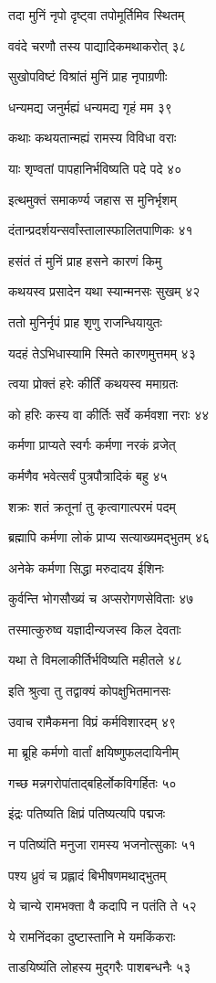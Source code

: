 तदा मुनिं नृपो दृष्ट्वा तपोमूर्तिमिव स्थितम्

ववंदे चरणौ तस्य पाद्यादिकमथाकरोत् ३८

सुखोपविष्टं विश्रांतं मुनिं प्राह नृपाग्रणीः

धन्यमद्य जनुर्मह्यं धन्यमद्य गृहं मम ३९

कथाः कथयतान्मह्यं रामस्य विविधा वराः

याः शृण्वतां पापहानिर्भविष्यति पदे पदे ४०

इत्थमुक्तं समाकर्ण्य जहास स मुनिर्भृशम्

दंतान्प्रदर्शयन्सर्वांस्तालास्फालितपाणिकः ४१

हसंतं तं मुनिं प्राह हसने कारणं किमु

कथयस्व प्रसादेन यथा स्यान्मनसः सुखम् ४२

ततो मुनिर्नृपं प्राह शृणु राजन्धियायुतः

यदहं तेऽभिधास्यामि स्मिते कारणमुत्तमम् ४३

त्वया प्रोक्तं हरेः कीर्तिं कथयस्व ममाग्रतः

को हरिः कस्य वा कीर्तिः सर्वे कर्मवशा नराः ४४

कर्मणा प्राप्यते स्वर्गः कर्मणा नरकं व्रजेत्

कर्मणैव भवेत्सर्वं पुत्रपौत्रादिकं बहु ४५

शक्रः शतं क्रतूनां तु कृत्वागात्परमं पदम्

ब्रह्मापि कर्मणा लोकं प्राप्य सत्याख्यमद्भुतम् ४६

अनेके कर्मणा सिद्धा मरुदादय ईशिनः

कुर्वन्ति भोगसौख्यं च अप्सरोगणसेविताः ४७

तस्मात्कुरुष्व यज्ञादीन्यजस्व किल देवताः

यथा ते विमलाकीर्तिर्भविष्यति महीतले ४८

इति श्रुत्वा तु तद्वाक्यं कोपक्षुभितमानसः

उवाच रामैकमना विप्रं कर्मविशारदम् ४९

मा ब्रूहि कर्मणो वार्तां क्षयिष्णुफलदायिनीम्

गच्छ मन्नगरोपांताद्बहिर्लोकविगर्हितः ५०

इंद्रः पतिष्यति क्षिप्रं पतिष्यत्यपि पद्मजः

न पतिष्यंति मनुजा रामस्य भजनोत्सुकाः ५१

पश्य ध्रुवं च प्रह्लादं बिभीषणमथाद्भुतम्

ये चान्ये रामभक्ता वै कदापि न पतंति ते ५२

ये रामनिंदका दुष्टास्तानि मे यमकिंकराः

ताडयिष्यंति लोहस्य मुद्गरैः पाशबन्धनैः ५३

